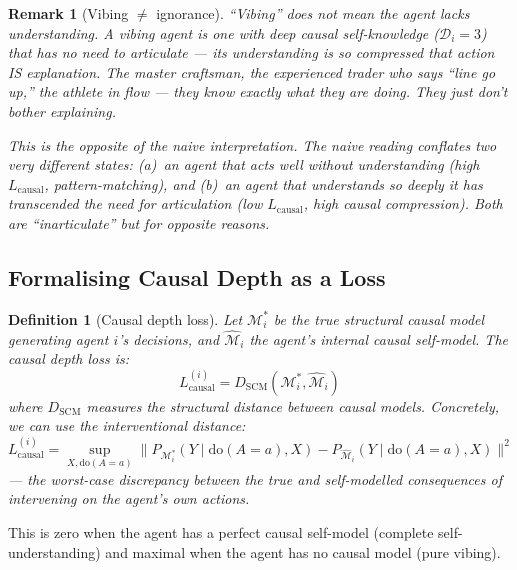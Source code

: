 \documentclass[11pt,a4paper]{article}
\newtheorem{definition}[theorem]{Definition}
\newtheorem{remark}[theorem]{Remark}
\newcommand{\norm}[1]{\|#1\|}
\begin{document}
\begin{remark}[Vibing $\neq$ ignorance]
``Vibing'' does \emph{not} mean the agent lacks understanding. A vibing
agent is one with \emph{deep} causal self-knowledge ($\mathcal{D}_i = 3$)
that has \emph{no need to articulate} --- its understanding is so
compressed that action IS explanation. The master craftsman, the
experienced trader who says ``line go up,'' the athlete in flow ---
they know exactly what they are doing. They just don't bother explaining.

This is the opposite of the naive interpretation. The naive reading
conflates two very different states: (a)~an agent that acts well
without understanding (high $L_{\text{causal}}$, pattern-matching), and
(b)~an agent that understands so deeply it has transcended the need
for articulation (low $L_{\text{causal}}$, high causal compression).
Both are ``inarticulate'' but for opposite reasons.
\end{remark}


\subsection{Formalising Causal Depth as a Loss}

\begin{definition}[Causal depth loss]\label{def:L-causal}
Let $\mathcal{M}_i^*$ be the true structural causal model generating
agent $i$'s decisions, and $\hat{\mathcal{M}}_i$ the agent's internal
causal self-model. The causal depth loss is:
\begin{equation}\label{eq:L-causal}
    L_{\text{causal}}^{(i)} = D_{\text{SCM}}(\mathcal{M}_i^*, \hat{\mathcal{M}}_i)
\end{equation}
where $D_{\text{SCM}}$ measures the structural distance between causal
models. Concretely, we can use the interventional distance:
\begin{equation}\label{eq:L-causal-interventional}
    L_{\text{causal}}^{(i)} = \sup_{X, \text{do}(A=a)}
    \norm{P_{\mathcal{M}_i^*}(Y \mid \text{do}(A=a), X) -
          P_{\hat{\mathcal{M}}_i}(Y \mid \text{do}(A=a), X)}^2
\end{equation}
--- the worst-case discrepancy between the true and self-modelled
consequences of intervening on the agent's own actions.
\end{definition}

This is zero when the agent has a perfect causal self-model (complete
self-understanding) and maximal when the agent has no causal model
(pure vibing).
\end{document}
